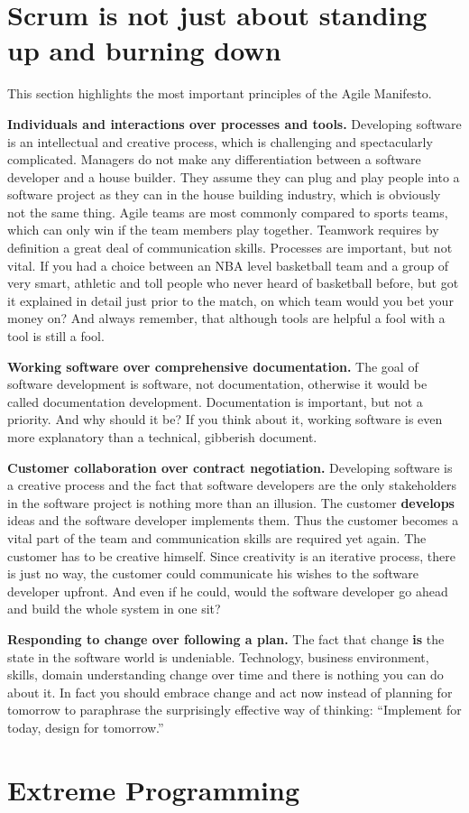 \section{Scrum is not just about standing up and burning down}
This section highlights the most important principles of the Agile
Manifesto.

{\bf Individuals and interactions over processes and tools.} Developing
software is an intellectual and creative process, which is challenging and spectacularly
complicated. Managers do not make any differentiation between a software
developer and a house builder. They assume they can plug and play people into a
software project as they can in the house building industry, which is obviously
not the same thing. Agile teams are most commonly compared to
sports teams, which can only win if the team members play together. Teamwork
requires by definition a great deal of communication skills. Processes are
important, but not vital. If you had a choice between an NBA level basketball
team and a group of very smart, athletic and toll people who never heard of
basketball before, but got it explained in detail just prior to the match, on
which team would you bet your money on? And always remember, that although tools
are helpful a fool with a tool is still a fool.

{\bf Working software over comprehensive documentation.} The goal of
software development is software, not documentation, otherwise it would be called
documentation development.\cite{Ambler200204} Documentation is important, but
not a priority. And why should it be? If you think about it, working software is
even more explanatory than a technical, gibberish document.

{\bf Customer collaboration over contract negotiation.} Developing software is a
creative process and the fact that software developers are the only stakeholders
in the software project is nothing more than an illusion. The customer {\bf
develops} ideas and the software developer implements them. Thus the customer
becomes a vital part of the team and communication skills are required yet
again. The customer has to be creative himself. Since creativity is an iterative
process, there is just no way, the customer could communicate his wishes to the
software developer upfront. And even if he could, would the software developer
go ahead and build the whole system in one sit?

{\bf Responding to change over following a plan.} The fact that change {\bf is}
the state in the software world is undeniable. Technology, business environment,
skills, domain understanding change over time and there is nothing you can do
about it. In fact you should embrace change and act now instead of planning for
tomorrow to paraphrase the surprisingly effective way of thinking:
\enquote{Implement for today, design for tomorrow.}\cite{BeckAndres200411}

\section{Extreme Programming}